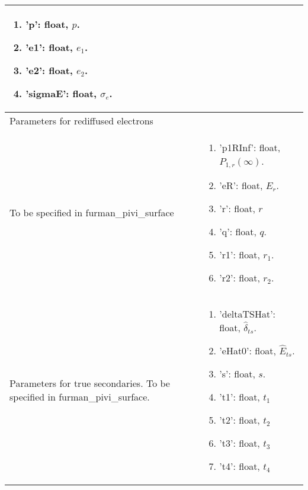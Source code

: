 \documentclass[a4paper,12pt]{article}
\begin{document}
\begin{longtable}{p{}p{}}
\begin{enumerate}
\item	'p': float, $p$.
\item	'e1': float, $e_1$.
\item	'e2': float, $e_2$.
\item	'sigmaE': float, $\sigma_e$.
\end{enumerate}\\
\hline
Parameters for rediffused electrons\\
To be specified in furman\_pivi\_surface
&\begin{enumerate}
\item	'p1RInf': float, $P_{1,r}(\infty)$.
\item	'eR': float, $E_r$.
\item	'r': float, $r$
\item	'q': float, $q$.
\item	'r1': float, $r_1$.
\item	'r2': float, $r_2$.
\end{enumerate}\\
\hline
Parameters for true secondaries. To be specified in furman\_pivi\_surface.
&\begin{enumerate}
\item	'deltaTSHat': float, $\hat{\delta}_{ts}$.
\item	'eHat0': float, $\hat{E}_{ts}$.
\item	's': float, $s$.
\item	't1': float, $t_1$
\item	't2': float, $t_2$
\item	't3': float, $t_3$
\item	't4': float, $t_4$
\end{enumerate}\\
\hline
\hline
\end{longtable}

\clearpage
\end{document}
